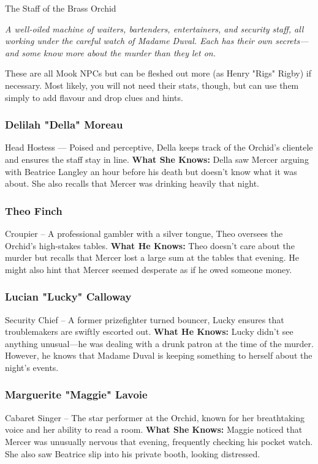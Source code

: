 \begin{WyrdFullNPC}[%
		name=The Staff of the Brass Orchid,%
		description=The people who keep the Orchid running,%
		float=!t%
	]{The Staff of the Brass Orchid}
	
    \emph{A well-oiled machine of waiters, bartenders, entertainers, and security staff, all working under the careful watch of Madame Duval. Each has their own secrets—and some know more about the murder than they let on.}
    
    \begin{WyrdGmTips}[color=bgtan]
    These are all Mook NPCs but can be fleshed out more (as Henry "Rigs" Rigby) if necessary. Most likely, you will not need their stats, though, but can use them simply to add flavour and drop clues and hints.
    \end{WyrdGmTips}
    
	\subsubsection*{Delilah "Della" Moreau}
	Head Hostess --- Poised and perceptive, Della keeps track of the Orchid’s clientele and ensures the staff stay in line.  
	\textbf{What She Knows:} Della saw Mercer arguing with Beatrice Langley an hour before his death but doesn’t know what it was about. She also recalls that Mercer was drinking heavily that night.

	\subsubsection*{Theo Finch}
	Croupier – A professional gambler with a silver tongue, Theo oversees the Orchid’s high-stakes tables.
	\textbf{What He Knows:} Theo doesn’t care about the murder but recalls that Mercer lost a large sum at the tables that evening. He might also hint that Mercer seemed desperate as if he owed someone money.

	\subsubsection*{Lucian "Lucky" Calloway}
	Security Chief – A former prizefighter turned bouncer, Lucky ensures that troublemakers are swiftly escorted out.
	\textbf{What He Knows:} Lucky didn’t see anything unusual—he was dealing with a drunk patron at the time of the murder. However, he knows that Madame Duval is keeping something to herself about the night’s events.

	\subsubsection*{Marguerite "Maggie" Lavoie} 
	Cabaret Singer – The star performer at the Orchid, known for her breathtaking voice and her ability to read a room.
	\textbf{What She Knows:} Maggie noticed that Mercer was unusually nervous that evening, frequently checking his pocket watch. She also saw Beatrice slip into his private booth, looking distressed.


\end{WyrdFullNPC}
